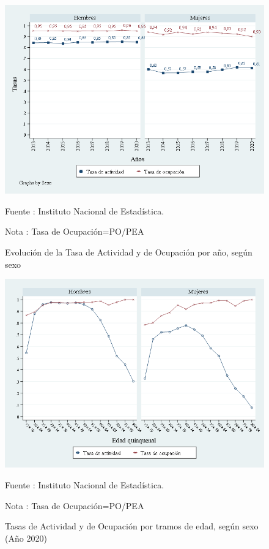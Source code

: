 \begin{figure}[H]
\begin{center}
                    \caption{Evolución de la Tasa de Actividad y de Ocupación por año, según sexo}
                    \includegraphics[scale=0.55]{EPH_tasas_sexo_ocup_act.png}
                                    \item \footnotesize Fuente : Instituto Nacional de Estadística.
                                    \item \footnotesize Nota : Tasa de Ocupación=PO/PEA
                    \end{center}
\end{figure}

\begin{figure}[H]
\begin{center}
                    \caption{Tasas de Actividad y de Ocupación por tramos de edad, según sexo (Año 2020)}
                    \includegraphics[scale=0.55]{EPH_tasasgq_ocupacion_actividad.png}
                                    \item \footnotesize Fuente : Instituto Nacional de Estadística.
                                    \item \footnotesize Nota : Tasa de Ocupación=PO/PEA
                    \end{center}
\end{figure}

